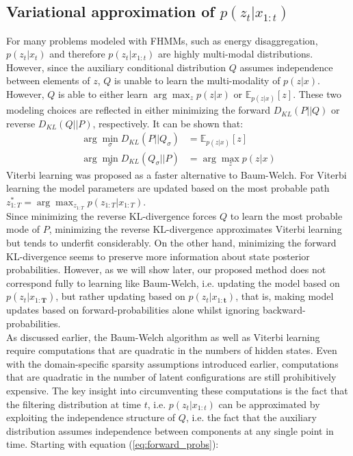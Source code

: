 \subsection{Variational approximation of $p(z_t|x_{1:t})$}
For many problems modeled with FHMMs, such as energy disaggregation, $p(z_t|x_t)$ and therefore $p(z_t|x_{1:t})$ are highly multi-modal distributions. However, since the auxiliary conditional distribution $Q$ assumes independence between elements of $z$, $Q$ is unable to learn the multi-modality of $p(z|x)$. However, $Q$ is able to either learn $\arg \max_z p(z|x)$ or $\mathbb{E}_{p(z|x)}[z]$. These two modeling choices are reflected in either minimizing the forward $D_{KL}(P||Q)$ or reverse $D_{KL}(Q||P)$, respectively. It can be shown that:
\begin{align*}
 \arg \min_{\sigma} D_{KL}(P||Q_\sigma) &= \mathbb{E}_{p(z|x)}[z] \\
 \arg \min_{\sigma} D_{KL}(Q_\sigma||P) &= \arg \max_z p(z|x)
 \end{align*}
Viterbi learning was proposed as a faster alternative to Baum-Welch. For Viterbi learning the model parameters are updated based on the most probable path $z^*_{1:T} = \arg \max_{z_{1:T}} p(z_{1:T} | x_{1:T})$.\\ Since minimizing the reverse KL-divergence forces $Q$ to learn the most probable mode of $P$, minimizing the reverse KL-divergence approximates Viterbi learning but tends to underfit considerably. On the other hand, minimizing the forward KL-divergence seems to preserve more information about state posterior probabilities. However, as we will show later, our proposed method does not correspond fully to learning like Baum-Welch, i.e. updating the model based on $p(z_t|x_{1:\boldsymbol{T}})$, but rather updating based on $p(z_t|x_{1:\boldsymbol{t}})$, that is, making model updates based on forward-probabilities alone whilst ignoring backward-probabilities.\\
As discussed earlier, the Baum-Welch algorithm as well as Viterbi learning require computations that are quadratic in the numbers of hidden states. Even with the domain-specific sparsity assumptions introduced earlier, computations that are quadratic in the number of latent configurations are still prohibitively expensive. The key insight into circumventing these computations is the fact that the filtering distribution at time $t$, i.e. $p(z_t|x_{1:t})$ can be approximated by exploiting the independence structure of $Q$, i.e. the fact that the auxiliary distribution assumes independence between components at any single point in time. Starting with equation (\ref{eq:forward_probs}):

